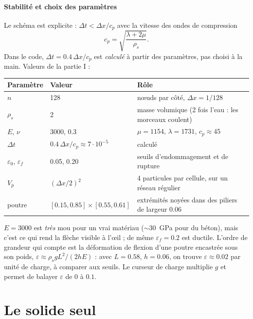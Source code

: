 \documentclass[11pt,a4paper]{article}
\begin{document}
\subsection{Stabilité et choix des paramètres}
\label{sec:stab}

Le schéma est explicite : $\Delta t < \Delta x / c_p$ avec la vitesse des ondes de compression
\[
  c_p = \sqrt{\frac{\lambda + 2\mu}{\rho_s}}.
\]
Dans le code, $\Delta t = 0.4\,\Delta x/c_p$ est \emph{calculé} à partir des paramètres, pas
choisi à la main. Valeurs de la partie I :

\begin{center}
\begin{tabular}{@{}lll@{}}
\toprule
Paramètre & Valeur & Rôle \\
\midrule
$n$ & 128 & n\oe uds par côté, $\Delta x = 1/128$ \\
$\rho_s$ & 2 & masse volumique (2 fois l'eau : les morceaux coulent) \\
$E$, $\nu$ & 3000, 0.3 & $\mu = 1154$, $\lambda = 1731$, $c_p \approx 45$ \\
$\Delta t$ & $0.4\,\Delta x/c_p \approx 7\cdot10^{-5}$ & calculé \\
$\varepsilon_0$, $\varepsilon_f$ & 0.05, 0.20 & seuils d'endommagement et de rupture \\
$V_p$ & $(\Delta x/2)^2$ & 4 particules par cellule, sur un réseau régulier \\
poutre & $[0.15, 0.85]\times[0.55, 0.61]$ & extrémités noyées dans des piliers de largeur 0.06 \\
\bottomrule
\end{tabular}
\end{center}

$E = 3000$ est \emph{très} mou pour un vrai matériau ($\sim 30$~GPa pour du béton), mais c'est ce
qui rend la flèche visible à l'\oe il ; de même $\varepsilon_f = 0.2$ est ductile. L'ordre de
grandeur qui compte est la déformation de flexion d'une poutre encastrée sous son poids,
$\varepsilon \approx \rho_s g L^2 / (2 h E)$ : avec $L = 0.58$, $h = 0.06$, on trouve
$\varepsilon \approx 0.02$ par unité de charge, à comparer aux seuils. Le curseur de charge
multiplie $g$ et permet de balayer $\varepsilon$ de 0 à $0.1$.

\part{Le solide seul}
\end{document}
